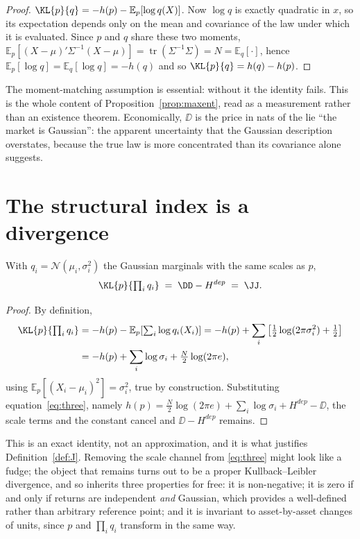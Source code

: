 \begin{proof}
$\KL{p}{q}=-h(p)-\mathbb{E}_p[\log q(X)]$. Now $\log q$ is exactly quadratic in
$x$, so its expectation depends only on the mean and covariance of the law under
which it is evaluated. Since $p$ and $q$ share these two moments,
$\mathbb{E}_p\!\left[(X-\mu)'\Sigma^{-1}(X-\mu)\right]=\operatorname{tr}(\Sigma^{-1}\Sigma)=N
=\mathbb{E}_q[\cdot]$, hence $\mathbb{E}_p[\log q]=\mathbb{E}_q[\log q]=-h(q)$ and
so $\KL{p}{q}=h(q)-h(p)$.
\end{proof}

The moment-matching assumption is essential: without it the identity fails. This
is the whole content of Proposition~\ref{prop:maxent}, read as a measurement
rather than an existence theorem. Economically, $\DD$ is the price in nats of the
lie ``the market is Gaussian'': the apparent uncertainty that the Gaussian
description overstates, because the true law is more concentrated than its
covariance alone suggests.

\section{The structural index is a divergence}
\label{app:index}

\begin{proposition}
\label{prop:index}
With $q_i=\mathcal N(\mu_i,\sigma_i^2)$ the Gaussian marginals with the same
scales as $p$,
\[
\KL{p}{\textstyle\prod_i q_i} \;=\; \DD - H^{dep} \;=\; \JJ .
\]
\end{proposition}

\begin{proof}
By definition,
\[
\begin{aligned}
\KL{p}{\textstyle\prod_i q_i} &= -h(p) - \mathbb{E}_p\!\left[\textstyle\sum_i\log q_i(X_i)\right]
= -h(p) + \sum_i\left[\tfrac12\log(2\pi\sigma_i^2)+\tfrac12\right]\\
&= -h(p) + \sum_i\log\sigma_i + \tfrac N2\log(2\pi e),
\end{aligned}
\]
using $\mathbb{E}_p[(X_i-\mu_i)^2]=\sigma_i^2$, true by construction. Substituting
equation~\eqref{eq:three}, namely
$h(p)=\tfrac N2\log(2\pi e)+\sum_i\log\sigma_i+H^{dep}-\DD$, the scale terms and
the constant cancel and $\DD-H^{dep}$ remains.
\end{proof}

This is an exact identity, not an approximation, and it is what justifies
Definition~\ref{def:J}. Removing the scale channel from \eqref{eq:three} might
look like a fudge; the object that remains turns out to be a proper
Kullback--Leibler divergence, and so inherits three properties for free: it is
non-negative; it is zero if and only if returns are independent \emph{and}
Gaussian, which provides a well-defined rather than arbitrary reference point;
and it is invariant to asset-by-asset changes of units, since $p$ and
$\prod_i q_i$ transform in the same way.

